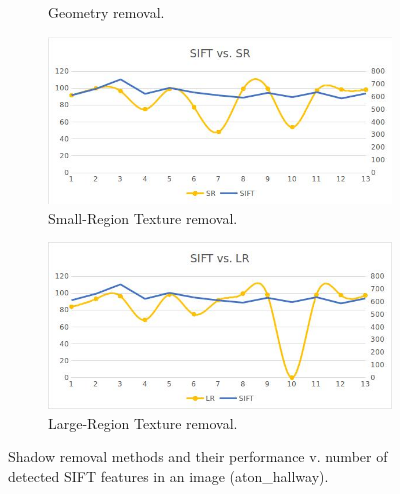 \documentclass[12pt]{report}
\begin{document}
\begin{figure}
\begin{subfigure}{.49\linewidth}
  \caption{Geometry removal.}
\end{subfigure}
\hfill
\begin{subfigure}{.49\linewidth}
  \includegraphics[width=1\linewidth]{figures/selectinganalgorithm_srt.jpg}
  \caption{Small-Region Texture removal.}
\end{subfigure}
\hfill
\begin{subfigure}{.49\linewidth}
  \includegraphics[width=1\linewidth]{figures/selectinganalgorithm_lrt.jpg}
  \caption{Large-Region Texture removal.}
\end{subfigure}

\caption{Shadow removal methods and their performance v. number of detected SIFT features in an image (aton\_hallway).}
\label{fig:selectinganalgorithm}
\end{figure}
\end{document}
